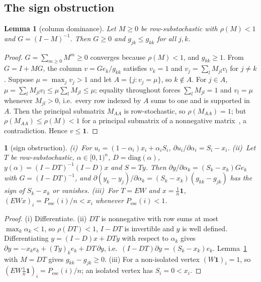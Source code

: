 \documentclass[11pt,a4paper]{article}
\newtheorem{lemma}{Lemma}
\theoremstyle{definition}
\theoremstyle{plain}
\newcommand{\genpropname}{}
\newtheorem*{genprop}{\genpropname}
\newenvironment{prop}[1]{\renewcommand{\genpropname}{Proposition #1}\begin{genprop}}{\end{genprop}}
\newcommand{\Pesc}{P_{\mathrm{esc}}}
\newcommand{\diag}{\mathrm{diag}}
\newcommand{\one}{\mathbf{1}}
\begin{document}
\subsection{The sign obstruction}

\begin{lemma}[column dominance]\label{lem:column}
Let $M\ge0$ be row-substochastic with $\rho(M)<1$ and $G=(I-M)^{-1}$. Then $G\ge0$ and $g_{jk}\le g_{kk}$ for all $j,k$.
\end{lemma}

\begin{proof}
$G=\sum_{m\ge0}M^m\ge0$ converges because $\rho(M)<1$, and $g_{kk}\ge1$. From $G=I+MG$, the column $v=Ge_k/g_{kk}$ satisfies $v_k=1$ and $v_j=\sum_lM_{jl}v_l$ for $j\ne k$. Suppose $\mu=\max_jv_j>1$ and let $A=\{j:v_j=\mu\}$, so $k\notin A$. For $j\in A$, $\mu=\sum_lM_{jl}v_l\le\mu\sum_lM_{jl}\le\mu$; equality throughout forces $\sum_lM_{jl}=1$ and $v_l=\mu$ whenever $M_{jl}>0$, i.e.\ every row indexed by $A$ sums to one and is supported in $A$. Then the principal submatrix $M_{AA}$ is row-stochastic, so $\rho(M_{AA})=1$; but $\rho(M_{AA})\le\rho(M)<1$ for a principal submatrix of a nonnegative matrix~\cite{hornjohnson13}, a contradiction. Hence $v\le\one$.
\end{proof}

\begin{prop}{E}[sign obstruction]
(i)~For $u_i=(1-\alpha_i)x_i+\alpha_iS_i$, $\partial u_i/\partial\alpha_i=S_i-x_i$. (ii)~Let $T$ be row-substochastic, $\alpha\in[0,1)^n$, $D=\diag(\alpha)$, $y(\alpha)=(I-DT)^{-1}(I-D)x$ and $S=Ty$. Then $\partial y/\partial\alpha_k=(S_k-x_k)Ge_k$ with $G=(I-DT)^{-1}$, and $\partial(y_k-y_j)/\partial\alpha_k=(S_k-x_k)(g_{kk}-g_{jk})$ has the sign of $S_k-x_k$ or vanishes. (iii)~For $T=EW$ and $x=\tfrac1n\one$, $(EWx)_i=\Pesc(i)/n<x_i$ whenever $\Pesc(i)<1$.
\end{prop}

\begin{proof}
(i) Differentiate. (ii) $DT$ is nonnegative with row sums at most $\max_k\alpha_k<1$, so $\rho(DT)<1$, $I-DT$ is invertible and $y$ is well defined. Differentiating $y=(I-D)x+DTy$ with respect to $\alpha_k$ gives $\partial y=-x_ke_k+(Ty)_ke_k+DT\,\partial y$, i.e.\ $(I-DT)\partial y=(S_k-x_k)e_k$. Lemma~\ref{lem:column} with $M=DT$ gives $g_{kk}-g_{jk}\ge0$. (iii) For a non-isolated vertex $(W\one)_i=1$, so $(EW\tfrac1n\one)_i=\Pesc(i)/n$; an isolated vertex has $S_i=0<x_i$.
\end{proof}
\end{document}
